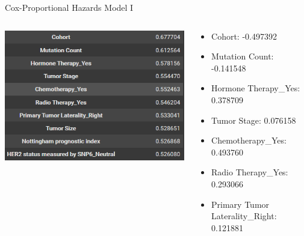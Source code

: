 \documentclass{beamer}
\begin{document}
\begin{frame}{Cox-Proportional Hazards Model I}
    \begin{columns}
        \begin{column}{0.49 \textwidth}
            \centering
            \includegraphics[width = \textwidth]{images/single.png}
        \end{column}
        \begin{column}{0.49 \textwidth}
            \begin{itemize}
                \item Cohort: -0.497392
                \item Mutation Count: -0.141548
                \item Hormone Therapy\_Yes: 0.378709
                \item Tumor Stage: 0.076158
                \item Chemotherapy\_Yes: 0.493760
		\item Radio Therapy\_Yes: 0.293066
		\item Primary Tumor Laterality\_Right: 0.121881
            \end{itemize}
        \end{column}
    \end{columns}
\end{frame}
\end{document}
